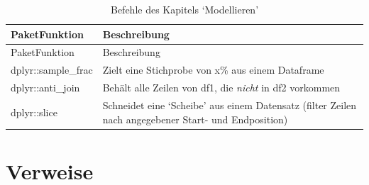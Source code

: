 \documentclass[12pt,ngerman,]{book}
\theoremstyle{definition}
\theoremstyle{definition}
\theoremstyle{remark}
\begin{document}
\begin{longtable}[]{@{}ll@{}}
\caption{Befehle des Kapitels `Modellieren'}\tabularnewline
\toprule
\begin{minipage}[b]{0.27\columnwidth}\raggedright\strut
PaketFunktion\strut
\end{minipage} & \begin{minipage}[b]{0.42\columnwidth}\raggedright\strut
Beschreibung\strut
\end{minipage}\tabularnewline
\midrule
\endfirsthead
\toprule
\begin{minipage}[b]{0.27\columnwidth}\raggedright\strut
PaketFunktion\strut
\end{minipage} & \begin{minipage}[b]{0.42\columnwidth}\raggedright\strut
Beschreibung\strut
\end{minipage}\tabularnewline
\midrule
\endhead
\begin{minipage}[t]{0.27\columnwidth}\raggedright\strut
dplyr::sample\_frac\strut
\end{minipage} & \begin{minipage}[t]{0.42\columnwidth}\raggedright\strut
Zielt eine Stichprobe von x\% aus einem Dataframe\strut
\end{minipage}\tabularnewline
\begin{minipage}[t]{0.27\columnwidth}\raggedright\strut
dplyr::anti\_join\strut
\end{minipage} & \begin{minipage}[t]{0.42\columnwidth}\raggedright\strut
Behält alle Zeilen von df1, die \emph{nicht} in df2 vorkommen\strut
\end{minipage}\tabularnewline
\begin{minipage}[t]{0.27\columnwidth}\raggedright\strut
dplyr::slice\strut
\end{minipage} & \begin{minipage}[t]{0.42\columnwidth}\raggedright\strut
Schneidet eine `Scheibe' aus einem Datensatz (filter Zeilen nach
angegebener Start- und Endposition)\strut
\end{minipage}\tabularnewline
\bottomrule
\end{longtable}

\section{Verweise}\label{verweise-4}
\end{document}
